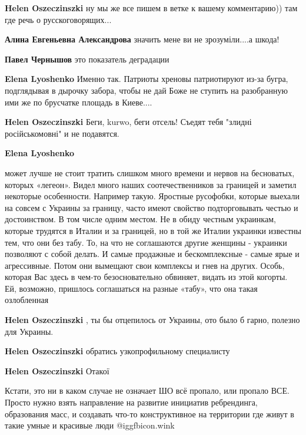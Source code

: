 \begin{itemize}
\begin{itemize}
\textbf{Helen Oszeczinszki} ну мы же все пишем в ветке к вашему комментарию)) там где речь о русскоговорящих...

\textbf{Алина Евгеньевна Александрова} значить мене ви не зрозуміли....а шкода!

\textbf{Павел Чернышов} это показатель деградации

\textbf{Elena Lyoshenko} Именно так. Патриоты хреновы патриотируют из-за бугра, подглядывая в дырочку забора, чтобы не дай Боже не ступить на разобранную ими же по брусчатке площадь в Киеве....

\textbf{Helen Oszeczinszki} Беги, kurwo, беги отсель! Съедят тебя "злидні російськомовні" и не подавятся.

\textbf{Elena Lyoshenko} 

может лучше не стоит тратить слишком много времени и нервов на бесноватых,
которых «легеон». Видел много наших соотечественников за границей и заметил
некоторые особенности. Например такую. Яростные русофобки, которые выехали на
совсем с Украины за границу, часто имеют свойство подторговывать честью и
достоинством. В том числе одним местом. Не в обиду честным украинкам, которые
трудятся в Италии и за границей, но в той же Италии украинки известны тем, что
они без табу. То, на что не соглашаются другие женщины - украинки позволяют с
собой делать. И самые продажные и бескомплексные - самые ярые и агрессивные.
Потом они вымещают свои комплексы и гнев на других. Особь, которая Вас здесь в
чем-то безосновательно обвиняет, видать из этой когорты. Ей, возможно, пришлось
соглашаться на разные «табу», что она такая озлобленная


\textbf{Helen Oszeczinszki} , ты бы отцепилось от Украины, ото было б гарно, полезно для Украины.

\textbf{Helen Oszeczinszki} обратись узкопрофильному специалисту

\textbf{Helen Oszeczinszki} Отакої

\end{itemize} %


Кстати, это ни в каком случае не означает ШО всё пропало, или пропало ВСЕ.
Просто нужно взять направление на развитие инициатив ребрендинга, образования
масс, и создавать что-то конструктивное на территории где живут в такие умные и
красивые люди @igg{fbicon.wink} 


\end{itemize}
